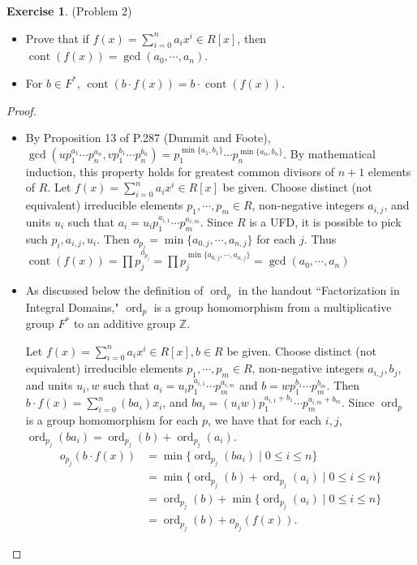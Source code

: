 \documentclass[12pt, psamsfonts]{amsart}
\theoremstyle{definition}
\newtheorem*{exer}{Exercise}
\theoremstyle{remark}
\DeclareMathOperator{\cont}{cont}
\DeclareMathOperator{\ord}{ord}
\numberwithin{equation}{section}
\begin{document}
\begin{exer}{(Problem 2)}
  $ $
  \begin{itemize}
    \item
      Prove that if $f(x) = \sum_{i=0}^{n} a_ix^i \in R[x]$, then $\cont(f(x)) = \gcd(a_0, \cdots, a_n)$.
    \item
      For $b \in F^*$, $\cont(b \cdot f(x)) = b \cdot \cont(f(x))$.
  \end{itemize}
\end{exer}

\begin{proof}
  $ $
  \begin{itemize}
    \item
      By Proposition 13 of P.287 (Dummit and Foote), $\gcd(up_1^{a_1} \cdots p_n^{a_n}, vp_1^{b_1} \cdots p_n^{b_n}) = p_1^{\min \{ a_1, b_1 \}} \cdots p_n^{\min \{ a_n, b_n \}}$.
      By mathematical induction, this property holds for greatest common divisors of $n + 1$ elements of $R$.
      Let $f(x) = \sum_{i=0}^{n} a_ix^i \in R[x]$ be given.
      Choose distinct (not equivalent) irreducible elements $p_1, \cdots, p_m \in R$, non-negative integers $a_{i, j}$, and units $u_i$ such that $a_i = u_ip_1^{a_{i, 1}} \cdots p_m^{a_{i, m}}$.
      Since $R$ is a UFD, it is possible to pick such $p_i, a_{i, j}, u_i$.
      Then $o_{p_j} = \min \{ a_{0, j}, \cdots, a_{n, j} \}$ for each $j$.
      Thus $\cont(f(x)) = \prod p_j^{o_{p_j}} = \prod p_j^{\min \{ a_{0, j}, \cdots, a_{n, j} \}} = \gcd(a_0, \cdots, a_n)$
    \item
      As discussed below the definition of $\ord_p$ in the handout ``Factorization in Integral Domains," $\ord_p$ is a group homomorphism from a multiplicative group $F^*$ to an additive group $\mathbb{Z}$.

      Let $f(x) = \sum_{i=0}^{n} a_ix^i \in R[x], b \in R$ be given.
      Choose distinct (not equivalent) irreducible elements $p_1, \cdots, p_m \in R$, non-negative integers $a_{i, j}, b_j$, and units $u_i, w$ such that $a_i = u_ip_1^{a_{i, 1}} \cdots p_m^{a_{i, m}}$ and $b = wp_1^{b_1} \cdots p_m^{b_m}$.
      Then $b \cdot f(x) = \sum_{i=0}^{n} (ba_i)x_i$, and $ba_i = (u_iw)p_1^{a_{i, 1} + b_1} \cdots p_m^{a_{i, m} + b_m}$.
      Since $\ord_p$ is a group homomorphism for each $p$, we have that for each $i, j$, $\ord_{p_j}(ba_i) = \ord_{p_j}(b) + \ord_{p_j}(a_i)$.
      \begin{align*}
        o_{p_j}(b \cdot f(x))
          &= \min\{ \ord_{p_j}(ba_i) \mid 0 \leq i \leq n \} \\
          &= \min\{ \ord_{p_j}(b) + \ord_{p_j}(a_i) \mid 0 \leq i \leq n \} \\
          &= \ord_{p_j}(b) + \min\{ \ord_{p_j}(a_i) \mid 0 \leq i \leq n \} \\
          &= \ord_{p_j}(b) + o_{p_j}(f(x)).
      \end{align*}


\end{itemize}
\end{proof}
\end{document}
